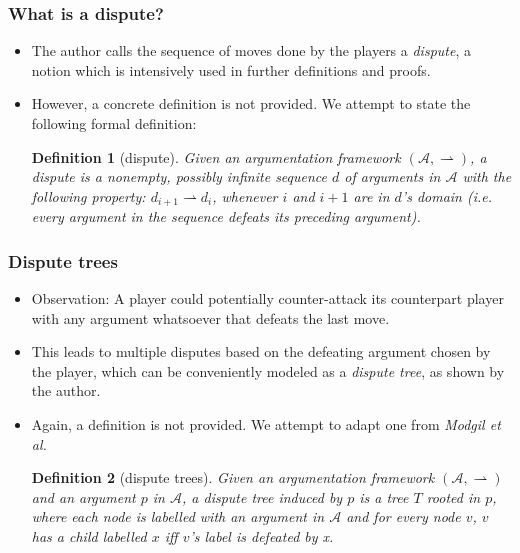 \documentclass{beamer}
\newtheorem{Def}{Definition}[subsection]
\newcommand{\df}{\ensuremath{\rightharpoonup}}
\begin{document}
\begin{frame}
	\frametitle{What is a dispute?}
	\begin{itemize}
		\item The author calls the sequence of moves done by the players a \emph{dispute}, a notion which is intensively used in further definitions and proofs. \pause
		\item However, a concrete definition is not provided. We attempt to state the following formal definition: \pause
		\begin{Def}[dispute]
			Given an argumentation framework $(\mathcal{A}, \df)$, a dispute is a nonempty, possibly infinite sequence $d$ of arguments in $\mathcal{A}$ with the following property: $d_{i+1} \df d_i$, whenever $i$ and $i+1$ are in $d$'s domain (i.e. every argument in the sequence defeats its preceding argument).
		\end{Def}
	\end{itemize}
\end{frame}

\begin{frame}
	\frametitle{Dispute trees}
	\begin{itemize}
		\item Observation: A player could potentially counter-attack its counterpart player with any argument whatsoever that defeats the last move. \pause
		\item This leads to multiple disputes based on the defeating argument chosen by the player, which can be conveniently modeled as a \emph{dispute tree}, as shown by the author.\pause
		\item Again, a definition is not provided. We attempt to adapt one from \emph{Modgil et al.}\pause
		\begin{Def}[dispute trees]
			Given an argumentation framework $(\mathcal{A}, \df)$ and an argument $p$ in $\mathcal{A}$, a dispute tree induced by $p$ is a tree $T$ rooted in $p$, where each node is labelled with an argument in $\mathcal{A}$  and for every node $v$, $v$ has a child labelled $x$ iff $v$'s label is defeated by x.
		\end{Def}
	\end{itemize}
\end{frame}
\end{document}
